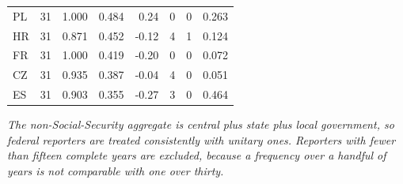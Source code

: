 \begin{table}[htbp]
{\begin{tabular}{@{}lrrrrrrr@{}}
PL & 31 & 1.000 & 0.484 & 0.24 & 0 & 0 & 0.263 \\
HR & 31 & 0.871 & 0.452 & -0.12 & 4 & 1 & 0.124 \\
FR & 31 & 1.000 & 0.419 & -0.20 & 0 & 0 & 0.072 \\
CZ & 31 & 0.935 & 0.387 & -0.04 & 4 & 0 & 0.051 \\
ES & 31 & 0.903 & 0.355 & -0.27 & 3 & 0 & 0.464 \\
\bottomrule
\end{tabular}%
}
\par\smallskip
\begin{minipage}{\linewidth}\footnotesize\itshape The non-Social-Security aggregate is central plus state plus local government, so federal reporters are treated consistently with unitary ones. Reporters with fewer than fifteen complete years are excluded, because a frequency over a handful of years is not comparable with one over thirty.\end{minipage}
\end{table}
